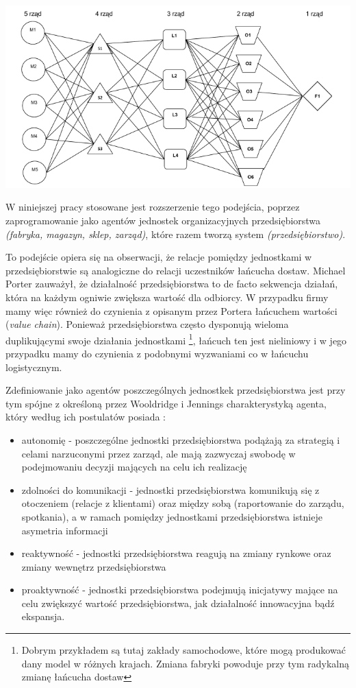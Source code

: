 \documentclass{article}
\begin{document}
\includegraphics[width=\linewidth]{pictures/siec.png}

W niniejszej pracy stosowane jest rozszerzenie tego podejścia, poprzez zaprogramowanie jako agentów jednostek organizacyjnych przedsiębiorstwa \textit{(fabryka, magazyn, sklep, zarząd)}, które razem tworzą system \textit{(przedsiębiorstwo)}. 

To podejście opiera się na obserwacji, że relacje pomiędzy jednostkami w przedsiębiorstwie są analogiczne do relacji uczestników łańcucha dostaw. Michael Porter zauważył, że działalność przedsiębiorstwa to de facto sekwencja działań, która na każdym ogniwie zwiększa wartość dla odbiorcy. W przypadku firmy mamy więc również do czynienia z opisanym przez Portera łańcuchem wartości (\textit{value chain}).  Ponieważ przedsiębiorstwa często dysponują wieloma duplikującymi swoje działania jednostkami \footnote{Dobrym przykładem są tutaj zakłady samochodowe, które mogą produkować dany model w różnych krajach. Zmiana fabryki powoduje przy tym radykalną zmianę łańcucha dostaw}, łańcuch ten jest nieliniowy i w jego przypadku mamy do czynienia z podobnymi wyzwaniami co w łańcuchu logistycznym.

Zdefiniowanie jako agentów poszczególnych jednostkek przedsiębiorstwa jest przy tym spójne z określoną przez Wooldridge i Jennings charakterystyką agenta, który według ich postulatów posiada : 
	\begin{itemize}
		\item autonomię - poszczególne jednostki przedsiębiorstwa podążają za strategią i celami narzuconymi przez zarząd, ale mają zazwyczaj swobodę w podejmowaniu decyzji mających na celu ich realizację
		\item zdolności do komunikacji - jednostki przedsiębiorstwa komunikują się z otoczeniem (relacje z klientami) oraz między sobą (raportowanie do zarządu, spotkania), a w ramach pomiędzy jednostkami przedsiębiorstwa istnieje asymetria informacji
		\item reaktywność - jednostki przedsiębiorstwa reagują na zmiany rynkowe oraz zmiany wewnętrz przedsiębiorstwa
	 	\item proaktywność - jednostki przedsiębiorstwa podejmują inicjatywy mające na celu zwiększyć wartość przedsiębiorstwa, jak działalność innowacyjna bądź ekspansja. 
	\end{itemize}
 
\end{document}
